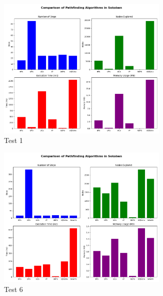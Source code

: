 \begin{figure}[H]
    \centering
    \begin{subfigure}{0.46\textwidth}
        \centering
        \includegraphics[width=0.9\textwidth]{imgs/test1.png}
        \caption{Test 1}
    \end{subfigure}
    \hfill
    \begin{subfigure}{0.46\textwidth}
        \centering
        \includegraphics[width=0.9\textwidth]{imgs/test6.png}
        \caption{Test 6}
    \end{subfigure}
    \vfill
    \begin{subfigure}{0.46\textwidth}
        \centering

\end{subfigure}
\end{figure}
